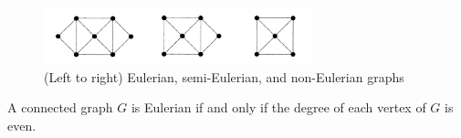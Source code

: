 \begin{figure}[ht]
  \begin{center}
    \includegraphics[width=0.69\textwidth]{figures/l02/eulerian-graphs}
  \end{center}
  \caption{(Left to right) Eulerian, semi-Eulerian, and non-Eulerian graphs}\label{fig:eulerian-graphs}
\end{figure}

\begin{theorem}[Euler, 1736]\label{thm:euler-graph-criterion}
  A connected graph \(G\) is Eulerian if and only if the degree of each vertex 
  of \(G\) is even.
\end{theorem}

